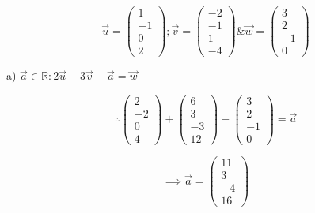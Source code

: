 

$$\overrightarrow{u} = \begin{pmatrix}
1 \\
-1 \\
0 \\
2
\end{pmatrix}; \overrightarrow{v} = \begin{pmatrix}
-2 \\
-1 \\
1 \\
-4
\end{pmatrix} \& \overrightarrow{w} = \begin{pmatrix}
3 \\
2 \\
-1 \\
0
\end{pmatrix}$$

a) $\overrightarrow{a} \in \mathbb{R} : 2\overrightarrow{u} - 3\overrightarrow{v} - \overrightarrow{a} = \overrightarrow{w}$

$$\therefore \begin{pmatrix}
2 \\
-2 \\
0 \\
4
\end{pmatrix} + \begin{pmatrix}
6 \\
3 \\
-3 \\
12
\end{pmatrix} - \begin{pmatrix}
3 \\
2 \\
-1 \\
0
\end{pmatrix} = \overrightarrow{a}$$

$$\implies \overrightarrow{a} = \begin{pmatrix}
11 \\
3 \\
-4 \\
16
\end{pmatrix}$$

